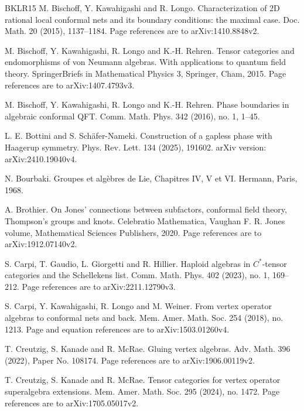 \documentclass[leqno]{article}
\numberwithin{equation}{section}
\begin{document}
\begin{thebibliography}{BKLR15}
M. Bischoff, Y. Kawahigashi and R. Longo.
\newblock Characterization of 2D rational local conformal nets and its boundary conditions: the maximal case.
\newblock Doc. Math. 20 (2015), 1137--1184. Page references are to arXiv:1410.8848v2.

M. Bischoff, Y. Kawahigashi, R. Longo and K.-H. Rehren.
\newblock Tensor categories and endomorphisms of von Neumann algebras. With applications to quantum field theory.
\newblock SpringerBriefs in Mathematical Physics 3, Springer, Cham, 2015. Page references are to arXiv:1407.4793v3.

M. Bischoff, Y. Kawahigashi, R. Longo and K.-H. Rehren.
\newblock Phase boundaries in algebraic conformal QFT.
\newblock Comm. Math. Phys. 342 (2016), no. 1, 1--45.

L. E. Bottini and S. Schäfer-Nameki.
\newblock Construction of a gapless phase with Haagerup symmetry.
\newblock Phys. Rev. Lett. 134 (2025), 191602. arXiv version: arXiv:2410.19040v4.

N. Bourbaki.
\newblock Groupes et alg\`ebres de Lie, Chapitres IV, V et VI.
\newblock Hermann, Paris, 1968.

A. Brothier.
\newblock On Jones' connections between subfactors, conformal field theory, Thompson's groups and knots.
\newblock Celebratio Mathematica, Vaughan F. R. Jones volume, Mathematical Sciences Publishers, 2020. Page references are to arXiv:1912.07140v2.

S. Carpi, T. Gaudio, L. Giorgetti and R. Hillier.
\newblock Haploid algebras in $C^*$-tensor categories and the Schellekens list.
\newblock Comm. Math. Phys. 402 (2023), no. 1, 169--212. Page references are to arXiv:2211.12790v3.

S. Carpi, Y. Kawahigashi, R. Longo and M. Weiner.
\newblock From vertex operator algebras to conformal nets and back.
\newblock Mem. Amer. Math. Soc. 254 (2018), no. 1213. Page and equation references are to arXiv:1503.01260v4.

T. Creutzig, S. Kanade and R. McRae.
\newblock Gluing vertex algebras.
\newblock Adv. Math. 396 (2022), Paper No. 108174. Page references are to arXiv:1906.00119v2.

T. Creutzig, S. Kanade and R. McRae.
\newblock Tensor categories for vertex operator superalgebra extensions.
\newblock Mem. Amer. Math. Soc. 295 (2024), no. 1472. Page references are to arXiv:1705.05017v2.


\end{thebibliography}
\end{document}
